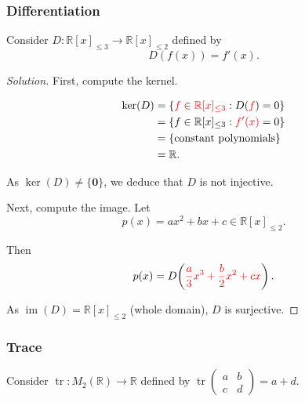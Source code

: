 \documentclass[12pt]{article}
\newenvironment{solution}
{\begin{proof}[Solution]}
{\end{proof}}
\begin{document}
\subsubsection{Differentiation}

Consider $D:\mathbb{R}[x]_{\le3}\longrightarrow \mathbb{R}[x]_{\le2}$ defined by
\[
D(f(x))=f'(x).
\]

\begin{solution}
First, compute the kernel.

\[
\begin{aligned}
\operatorname{ker}(D)
&=
\{\textcolor{red}{f\in\mathbb{R}[x]_{\le3}}:D(\textcolor{red}{f})=0\}\\
&=
\{f\in\mathbb{R}[x]_{\le3}:\textcolor{red}{f'(x)}=0\}\\
&=
\{\text{constant polynomials}\}\\
&=\mathbb{R}.
\end{aligned}
\]

As $\operatorname{ker}(D)\neq\{\mathbf{0}\}$, we deduce that $D$ is not injective.

Next, compute the image. Let
\[
p(x)=ax^2+bx+c\in \mathbb{R}[x]_{\le2}.
\]

Then
\[
p(x)=D\!
\left(\textcolor{red}{\frac{a}{3}x^3+\frac{b}{2}x^2+cx}\right).
\]

As $\operatorname{im}(D)=\mathbb{R}[x]_{\le2}$ (whole domain), $D$ is surjective.

\end{solution}

\subsubsection{Trace}

Consider $\operatorname{tr}:M_2(\mathbb{R})\longrightarrow\mathbb{R}$ defined by
$
\operatorname{tr}
\begin{pmatrix}
a&b\\
c&d
\end{pmatrix}
= a+d.
$
\end{document}
